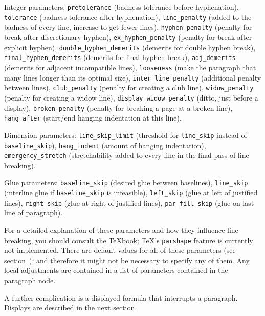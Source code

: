 \itemize
\item
Integer parameters:\hfill\break
{\tt pretolerance} (badness tolerance before hyphenation),\hfill\break
{\tt tolerance} (badness tolerance after hyphenation),\hfill\break
{\tt line\_penalty} (added to the badness of every line, increase to get fewer lines),\hfill\break
{\tt hy\-phen\_pe\-nal\-ty} (penalty for break after discretionary hyphen),\hfill\break
{\tt ex\_hy\-phen\_pe\-nal\-ty} (penalty for break after explicit hyphen),\hfill\break
{\tt doub\-le\_hy\-phen\_de\-merits} (demerits for double hyphen break),\hfill\break
{\tt final\_hyphen\_de\-me\-rits} (demerits for final hyphen break),\hfill\break
{\tt adj\_demerits} (demerits for adjacent incompatible lines),\hfill\break
{\tt looseness} (make the paragraph that many lines longer than its optimal size),\hfill\break
{\tt inter\_line\_penalty} (additional penalty between lines),\hfill\break
{\tt club\_pe\-nal\-ty} (penalty for creating a club line),\hfill\break
{\tt widow\_penalty} (penalty for creating a widow line),\hfill\break
{\tt display\_widow\_penalty} (ditto, just before a display),\hfill\break
{\tt bro\-ken\_pe\-nal\-ty} (penalty for breaking a page at a broken line),\hfill\break
{\tt hang\_af\-ter} (start/end hanging indentation at this line).
\item
Dimension parameters:\hfill\break
{\tt line\_skip\_limit} (threshold for {\tt line\_skip} instead of {\tt base\-line\_skip}),\hfill\break
{\tt hang\_in\-dent} (amount of hanging indentation),\hfill\break
{\tt emergency\_stretch} (stretchability added to every line in the final pass of line breaking).
\item
Glue parameters:\hfill\break
{\tt baseline\_skip} (desired glue between baselines),\hfill\break
{\tt line\_skip} (interline glue if {\tt baseline\_skip} is infeasible),\hfill\break
{\tt left\_skip} (glue at left of justified lines),\hfill\break
{\tt right\_skip} (glue at right of justified lines),\hfill\break
{\tt par\_fill\_skip} (glue on last line of paragraph).
\enditemize


For a detailed explanation of these parameters and how they influence line breaking, you should consult the  {\TeX}book\cite{DK:texbook}; \TeX's {\tt parshape} feature is currently not implemented.
There are default values for all of these parameters (see section~); and therefore
it might not be necessary to specify any of them. Any local adjustments
are contained in a list of parameters contained in the paragraph node.

A further complication is a displayed formula that interrupts a paragraph.
Displays are described in the next section.

